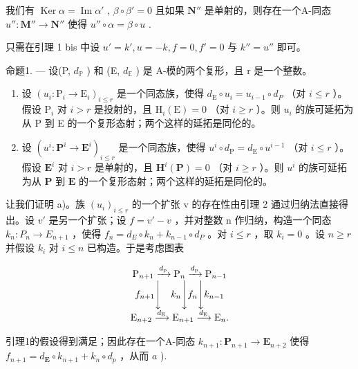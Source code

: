 我们有 \(\operatorname{Ker} \alpha = \operatorname{Im} \alpha'\) , \(\beta \circ \beta' = 0\) 且如果 \(\mathbf{N}''\) 是单射的，则存在一个A-同态 \(u'' : \mathbf{M}'' \to \mathbf{N}''\) 使得 \(u'' \circ \alpha = \beta \circ u\) .

只需在引理 1 bis 中设 \(u' = k', u = -k, f = 0, f' = 0\) 与 \(k'' = u''\) 即可。

命题1. --- 设(P, \(d_{\mathbb{P}}\) ) 和 (E, \(d_{\mathbb{E}}\) ) 是 A-模的两个复形，且 r 是一个整数。

\begin{enumerate}
\def\labelenumi{\alph{enumi})}
\item
  设 \((u_i: \mathrm{P}_i \to \mathrm{E}_i)_{i \leqslant r}\) 是一个同态族，使得 \(d_{\mathrm{E}} \circ u_i = u_{i-1} \circ d_P\) （对 \(i \leqslant r\) ）。假设 \(\mathrm{P}_i\) 对 \(i > r\) 是投射的，且 \(\mathrm{H}_i(\mathrm{E}) = 0\) （对 \(i \geqslant r\) ）。则 \(u_i\) 的族可延拓为从 P 到 E 的一个复形态射；两个这样的延拓是同伦的。
\item
  设 \((u^{i}:\mathbf{P}^{i}\to\mathbf{E}^{i})_{i\leqslant r}\) 是一个同态族，使得 \(u^{i}\circ d_{\mathrm{P}}=d_{\mathrm{E}}\circ u^{i-1}\) （对 \(i\leqslant r\) ）。假设 \(\mathbf{E}^{i}\) 对 \(i>r\) 是单射的，且 \(\mathbf{H}^{i}(\mathbf{P})=0\) （对 \(i\geqslant r\) ）。则 \(u^{i}\) 的族可延拓为从 \(\mathbf{P}\) 到 \(\mathbf{E}\) 的一个复形态射；两个这样的延拓是同伦的。
\end{enumerate}

让我们证明 a)。族 \((u_{i})_{i\leqslant r}\) 的一个扩张 v 的存在性由引理 2 通过归纳法直接得出。设 \(v'\) 是另一个扩张；设 \(f=v'-v\) ，并对整数 n 作归纳，构造一个同态 \(k_{n}:P_{n}\to E_{n+1}\) ，使得 \(f_{n}=d_{E}\circ k_{n}+k_{n-1}\circ d_{P}\) 。对 \(i\leqslant r\) ，取 \(k_{i}=0\) 。设 \(n\geqslant r\) 并假设 \(k_{i}\) 对 \(i\leqslant n\) 已构造。于是考虑图表

\[
\begin{array}{c} \mathrm{P} _ {n + 1} \xrightarrow {d _ {\mathrm{p}}} \mathrm{P} _ {n} \xrightarrow {d _ {\mathrm{p}}} \mathrm{P} _ {n - 1} \\ f _ {n + 1} \Biggl \downarrow \quad k _ {n} \Biggl \downarrow f _ {n} \Biggl \downarrow k _ {n - 1} \\ \mathrm{E} _ {n + 2} \xrightarrow {d _ {\mathrm{E}}} \mathrm{E} _ {n + 1} \xrightarrow {d _ {\mathrm{E}}} \mathrm{E} _ {n}. \end{array}
\]

引理1的假设得到满足；因此存在一个A-同态 \(k_{n+1}: \mathbf{P}_{n+1} \to \mathbf{E}_{n+2}\) 使得 \(f_{n+1} = d_{\mathbf{E}} \circ k_{n+1} + k_n \circ d_p\) ，从而 \(a\) ).

